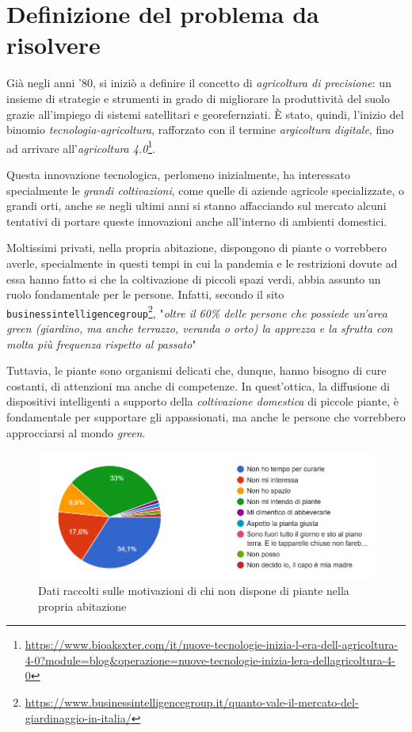\section{Definizione del problema da risolvere}

Già negli anni '80, si iniziò a definire il concetto di \textit{agricoltura di precisione}: un insieme di strategie e strumenti in grado di migliorare la produttività del suolo grazie all'impiego di sistemi satellitari e georefernziati. \`E stato, quindi, l'inizio del binomio \textit{tecnologia-agricoltura}, rafforzato con il termine \textit{argicoltura digitale}, fino ad arrivare all'\textit{agricoltura 4.0}\footnote{\url{https://www.bioaksxter.com/it/nuove-tecnologie-inizia-l-era-dell-agricoltura-4-0?module=blog&operazione=nuove-tecnologie-inizia-lera-dellagricoltura-4-0}}.

Questa innovazione tecnologica, perlomeno inizialmente, ha interessato specialmente le \textit{grandi coltivazioni}, come quelle di aziende agricole specializzate, o grandi orti, anche se negli ultimi anni si stanno affacciando sul mercato alcuni tentativi di portare queste innovazioni anche all'interno di ambienti domestici.

Moltissimi privati, nella propria abitazione, dispongono di piante o vorrebbero averle, specialmente in questi tempi in cui la pandemia e le restrizioni dovute ad essa hanno fatto si che la coltivazione di piccoli spazi verdi, abbia assunto un ruolo fondamentale per le persone. Infatti, secondo il sito \texttt{businessintelligencegroup}\footnote{\url{https://www.businessintelligencegroup.it/quanto-vale-il-mercato-del-giardinaggio-in-italia/}}, "\textit{oltre il 60\% delle persone che possiede un’area green (giardino, ma anche terrazzo, veranda o orto) la apprezza e la sfrutta con molta più frequenza rispetto al passato}"

Tuttavia, le piante sono organismi delicati che, dunque, hanno bisogno di cure costanti, di attenzioni ma anche di competenze. In quest'ottica, la diffusione di dispositivi intelligenti a supporto della \textit{coltivazione domestica} di piccole piante, è fondamentale per supportare gli appassionati, ma anche le persone che vorrebbero approcciarsi al mondo \textit{green}.

\begin{figure}[h!]
	\centering
	\includegraphics[width=\columnwidth]{images/torta_perche_no_piante.png}
	\caption{Dati raccolti sulle motivazioni di chi non dispone di piante nella propria abitazione}
	\label{fig:whynot}
\end{figure}

